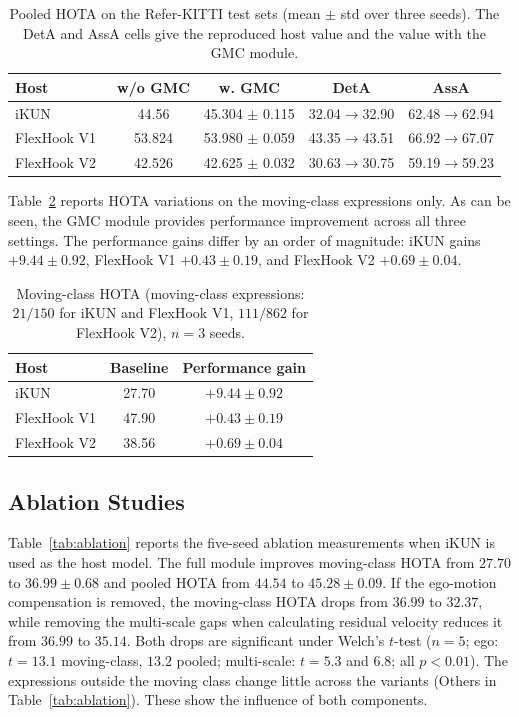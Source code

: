 \documentclass{article}
\begin{document}
\begin{table}[t]
  \centering
  \caption{Pooled HOTA on the Refer-KITTI test sets (mean $\pm$ std over three seeds). The DetA and AssA cells give the reproduced host value and the value with the GMC module.}
  \label{tab:main}
  \footnotesize
  \setlength{\tabcolsep}{1.5pt}
  \begin{tabular}{lcccc}
    \hline
    Host                        & w/o GMC & w. GMC              & DetA & AssA \\
    \hline
    iKUN~\cite{ikun}            & 44.56   & 45.304 $\pm$ 0.115 & 32.04${\to}$32.90 & 62.48${\to}$62.94 \\
    FlexHook V1~\cite{flexhook} & 53.824  & 53.980 $\pm$ 0.059 & 43.35${\to}$43.51 & 66.92${\to}$67.07 \\
    FlexHook V2~\cite{flexhook} & 42.526  & 42.625 $\pm$ 0.032 & 30.63${\to}$30.75 & 59.19${\to}$59.23 \\
    \hline
  \end{tabular}
\end{table}

Table~\ref{tab:deficit} reports HOTA variations on the moving-class expressions only. As can be seen, the GMC module provides performance improvement across all three settings. The performance gains differ by an order of magnitude: iKUN gains $+9.44\pm0.92$, FlexHook V1 $+0.43\pm0.19$, and FlexHook V2 $+0.69\pm0.04$.

\begin{table}
  \centering
  \caption{Moving-class HOTA (moving-class expressions: $21/150$ for iKUN and FlexHook V1, $111/862$ for FlexHook V2), $n{=}3$ seeds.}
  \label{tab:deficit}
  \small
  \setlength{\tabcolsep}{2pt}
  \begin{tabular}{lcc}
    \hline
    Host        & Baseline & Performance gain \\
    \hline
    iKUN        & 27.70    & $+9.44\pm0.92$   \\
    FlexHook V1 & 47.90    & $+0.43\pm0.19$   \\
    FlexHook V2 & 38.56    & $+0.69\pm0.04$   \\
    \hline
  \end{tabular}
\end{table}

\subsection{Ablation Studies}
\label{sec:ablation}
Table~\ref{tab:ablation} reports the five-seed ablation measurements when iKUN is used as the host model. The full module improves moving-class HOTA from $27.70$ to $36.99\pm0.68$ and pooled HOTA from $44.54$ to $45.28\pm0.09$. If the ego-motion compensation is removed, the moving-class HOTA drops from $36.99$ to $32.37$, while removing the multi-scale gaps when calculating residual velocity reduces it from $36.99$ to $35.14$. Both drops are significant under Welch's $t$-test ($n{=}5$; ego: $t{=}13.1$ moving-class, $13.2$ pooled; multi-scale: $t{=}5.3$ and $6.8$; all $p{<}0.01$). The expressions outside the moving class change little across the variants (Others in Table~\ref{tab:ablation}). These show the influence of both components.
\end{document}
